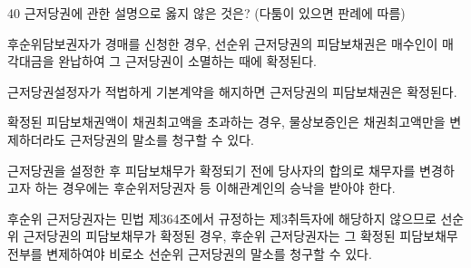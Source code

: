 \begin{question}{40}
근저당권에 관한 설명으로 옳지 않은 것은? (다툼이 있으면 판례에 따름)
\begin{choices}
  \item 후순위담보권자가 경매를 신청한 경우, 선순위 근저당권의 피담보채권은 매수인이 매각대금을 완납하여 그 근저당권이 소멸하는 때에 확정된다.
  \item 근저당권설정자가 적법하게 기본계약을 해지하면 근저당권의 피담보채권은 확정된다.
  \item 확정된 피담보채권액이 채권최고액을 초과하는 경우, 물상보증인은 채권최고액만을 변제하더라도 근저당권의 말소를 청구할 수 있다.
  \item 근저당권을 설정한 후 피담보채무가 확정되기 전에 당사자의 합의로 채무자를 변경하고자 하는 경우에는 후순위저당권자 등 이해관계인의 승낙을 받아야 한다.
  \item 후순위 근저당권자는 민법 제364조에서 규정하는 제3취득자에 해당하지 않으므로 선순위 근저당권의 피담보채무가 확정된 경우, 후순위 근저당권자는 그 확정된 피담보채무 전부를 변제하여야 비로소 선순위 근저당권의 말소를 청구할 수 있다.
\end{choices}
\end{question}
